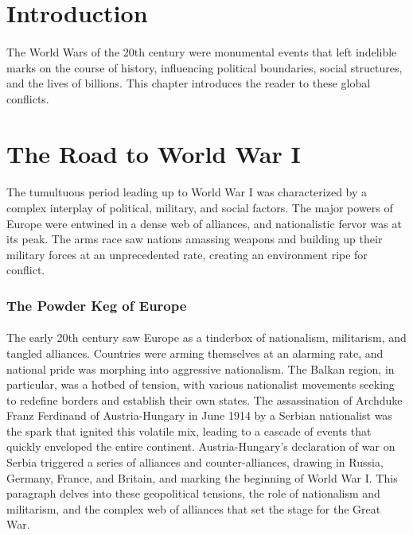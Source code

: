 \documentclass[a4paper,12pt]{book}
\begin{document}
\section*{Introduction}
\paragraph{}
The World Wars of the 20th century were monumental events that left indelible marks on the course of history, influencing political boundaries, social structures, and the lives of billions. This chapter introduces the reader to these global conflicts.

\section*{The Road to World War I}
\paragraph{}
The tumultuous period leading up to World War I was characterized by a complex interplay of political, military, and social factors. The major powers of Europe were entwined in a dense web of alliances, and nationalistic fervor was at its peak. The arms race saw nations amassing weapons and building up their military forces at an unprecedented rate, creating an environment ripe for conflict.

\subsubsection*{The Powder Keg of Europe}
\paragraph{}
The early 20th century saw Europe as a tinderbox of nationalism, militarism, and tangled alliances. Countries were arming themselves at an alarming rate, and national pride was morphing into aggressive nationalism. The Balkan region, in particular, was a hotbed of tension, with various nationalist movements seeking to redefine borders and establish their own states. The assassination of Archduke Franz Ferdinand of Austria-Hungary in June 1914 by a Serbian nationalist was the spark that ignited this volatile mix, leading to a cascade of events that quickly enveloped the entire continent. Austria-Hungary's declaration of war on Serbia triggered a series of alliances and counter-alliances, drawing in Russia, Germany, France, and Britain, and marking the beginning of World War I. This paragraph delves into these geopolitical tensions, the role of nationalism and militarism, and the complex web of alliances that set the stage for the Great War.
\end{document}
